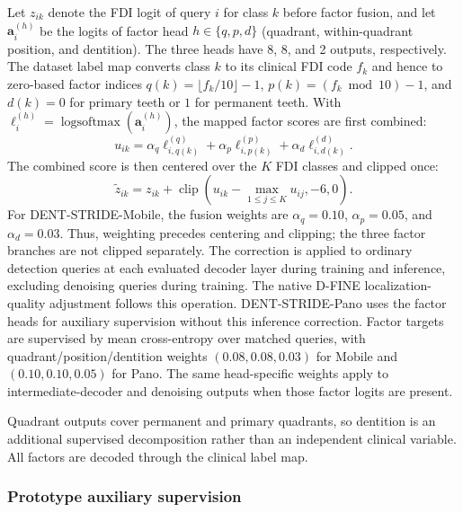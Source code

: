 \documentclass[a4paper,fleqn]{cas-dc}
\begin{document}
Let $z_{ik}$ denote the FDI logit of query $i$ for class $k$ before factor fusion, and let $\mathbf{a}_{i}^{(h)}$ be the logits of factor head $h\in\{q,p,d\}$ (quadrant, within-quadrant position, and dentition). The three heads have 8, 8, and 2 outputs, respectively. The dataset label map converts class $k$ to its clinical FDI code $f_k$ and hence to zero-based factor indices $q(k)=\lfloor f_k/10\rfloor-1$, $p(k)=(f_k\bmod 10)-1$, and $d(k)=0$ for primary teeth or $1$ for permanent teeth. With $\boldsymbol{\ell}_{i}^{(h)}=\operatorname{logsoftmax}(\mathbf{a}_{i}^{(h)})$, the mapped factor scores are first combined:
\begin{equation}
 u_{ik}=\alpha_q\ell_{i,q(k)}^{(q)}
       +\alpha_p\ell_{i,p(k)}^{(p)}
       +\alpha_d\ell_{i,d(k)}^{(d)}.
 \label{eq:factor-score}
\end{equation}
The combined score is then centered over the $K$ FDI classes and clipped once:
\begin{equation}
 \widetilde z_{ik}=z_{ik}
 +\operatorname{clip}\!\left(u_{ik}-\max_{1\leq j\leq K}u_{ij},-6,0\right).
 \label{eq:factor-fusion}
\end{equation}
For DENT-STRIDE-Mobile, the fusion weights are $\alpha_q=0.10$, $\alpha_p=0.05$, and $\alpha_d=0.03$. Thus, weighting precedes centering and clipping; the three factor branches are not clipped separately. The correction is applied to ordinary detection queries at each evaluated decoder layer during training and inference, excluding denoising queries during training. The native D-FINE localization-quality adjustment follows this operation. DENT-STRIDE-Pano uses the factor heads for auxiliary supervision without this inference correction. Factor targets are supervised by mean cross-entropy over matched queries, with quadrant/position/dentition weights $(0.08,0.08,0.03)$ for Mobile and $(0.10,0.10,0.05)$ for Pano. The same head-specific weights apply to intermediate-decoder and denoising outputs when those factor logits are present.

Quadrant outputs cover permanent and primary quadrants, so dentition is an additional supervised decomposition rather than an independent clinical variable. All factors are decoded through the clinical label map.

\subsubsection{Prototype auxiliary supervision}
\label{sec:prototypes}
\end{document}
